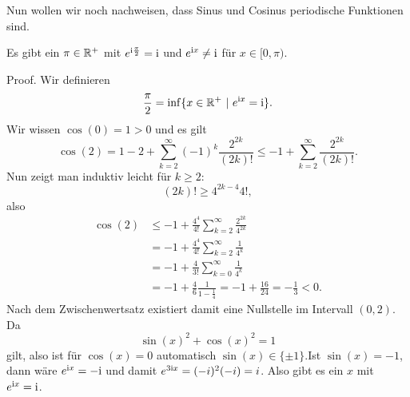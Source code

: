 Nun wollen wir noch nachweisen, dass Sinus  und Cosinus periodische Funktionen sind.
\label{stetigkeit/trig:lemma-0}
\begin{lemma}{}{}



Es gibt ein \(\pi \in \mathbb{R}^+\) mit \(e^{\mathrm{i} \frac{\pi}2} = \mathrm{i}\) und \(e^{\mathrm{i} x} \neq \mathrm{i}\) für \(x \in [0,\pi)\).
\end{lemma}

\begin{emphBox}{}{}
Proof.  Wir definieren
\begin{equation*}
 \frac{\pi}2 = \inf\{x \in \mathbb{R}^+~|~e^{\mathrm{i} x } = \mathrm{i} \}.
\end{equation*}
Wir wissen \(\cos(0)=1 > 0\) und es gilt
\begin{equation*}
 \cos(2)= 1 -2 + \sum_{k=2}^\infty (-1)^k \frac{2^{2k}}{(2k)!} \leq -1 + \sum_{k=2}^\infty  \frac{2^{2k}}{(2k)!} .
\end{equation*}
Nun zeigt man induktiv leicht für \(k \geq 2\):
\begin{equation*}
 (2k)! \geq 4^{2k-4} 4! ,
\end{equation*}
also
\begin{align*}
\cos(2) &\leq -1 + \frac{4^4}{4!} \sum_{k=2}^\infty \frac{2^{2k}}{4^{2k}} \\
&= -1   + \frac{4^4}{4!} \sum_{k=2}^\infty \frac{1}{4^{k}} \\
&= -1   + \frac{4 }{3!} \sum_{k=0}^\infty \frac{1}{4^{k}} \\
&= -1 + \frac{4}{6} \frac{1}{1-\frac{1}4} = -1 + \frac{16}{24}  = - \frac{1}{3} < 0.
\end{align*}
Nach dem Zwischenwertsatz existiert damit eine Nullstelle im Intervall \((0,2)\). Da
\begin{equation*}
 \sin(x)^2 + \cos(x)^2 = 1
\end{equation*}
gilt, also ist für \(\cos(x) = 0\) automatisch \(\sin(x) \in \{\pm 1\}\).Ist \(\sin(x) = -1\), dann wäre \(e^{\mathrm{i} x} = -\mathrm{i}\) und damit \(e^{3\mathrm{i} x} = (-i)^2(-i) = i\). Also gibt es ein \(x\) mit \(e^{\mathrm{i} x} =\mathrm{i}\).
\end{emphBox}

